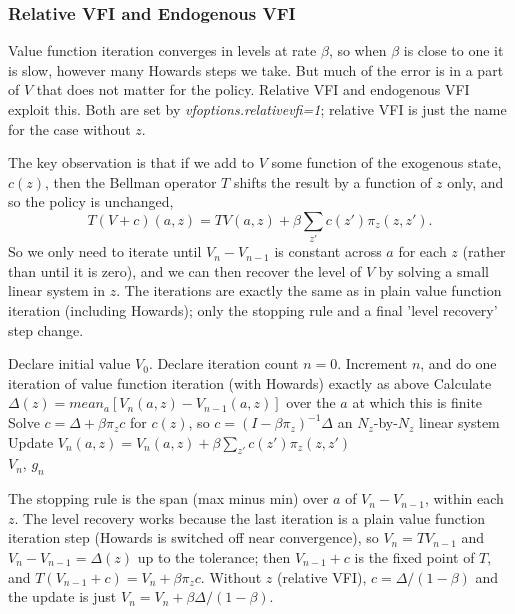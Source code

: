 \subsubsection{Relative VFI and Endogenous VFI} \label{sec:endovfi}
Value function iteration converges in levels at rate $\beta$, so when $\beta$ is close to one it is slow, however many Howards steps we take. But much of the error is in a part of $V$ that does not matter for the policy. Relative VFI \citep{Bray2019} and endogenous VFI \citep{Bray2017} exploit this. Both are set by \textit{vfoptions.relativevfi=1}; relative VFI is just the name for the case without $z$.

The key observation is that if we add to $V$ some function of the exogenous state, $c(z)$, then the Bellman operator $T$ shifts the result by a function of $z$ only, and so the policy is unchanged,
\begin{equation*}
 T(V+c)(a,z)=TV(a,z)+\beta \sum_{z'}c(z')\pi_z(z,z').
\end{equation*}
So we only need to iterate until $V_n-V_{n-1}$ is constant across $a$ for each $z$ (rather than until it is zero), and we can then recover the level of $V$ by solving a small linear system in $z$. The iterations are exactly the same as in plain value function iteration (including Howards); only the stopping rule and a final 'level recovery' step change.
\begin{algorithmic}
 \State Declare initial value $V_0$.
 \State Declare iteration count $n=0$.
   \State Increment $n$, and do one iteration of value function iteration (with Howards) exactly as above
 \EndWhile
 \State Calculate $\Delta(z)=mean_a [V_n(a,z)-V_{n-1}(a,z)]$ \Comment over the $a$ at which this is finite
 \State Solve $c=\Delta+\beta\pi_z c$ for $c(z)$, so $c=(I-\beta\pi_z)^{-1}\Delta$ \Comment an $N_z$-by-$N_z$ linear system
 \State Update $V_n(a,z)=V_n(a,z)+\beta \sum_{z'}c(z')\pi_z(z,z')$
 \\ \Return $V_n$, $g_n$
\end{algorithmic}
The stopping rule is the span (max minus min) over $a$ of $V_n-V_{n-1}$, within each $z$. The level recovery works because the last iteration is a plain value function iteration step (Howards is switched off near convergence), so $V_n=T V_{n-1}$ and $V_n-V_{n-1}=\Delta(z)$ up to the tolerance; then $V_{n-1}+c$ is the fixed point of $T$, and $T(V_{n-1}+c)=V_n+\beta\pi_z c$. Without $z$ (relative VFI), $c=\Delta/(1-\beta)$ and the update is just $V_n=V_n+\beta\Delta/(1-\beta)$.

